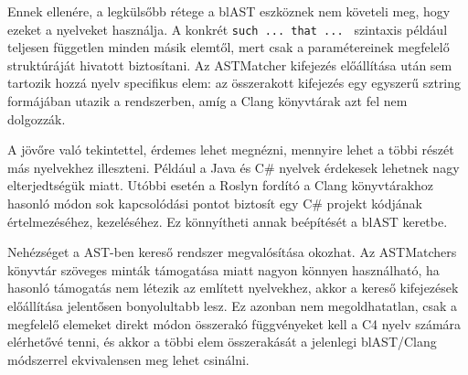 Ennek ellenére, a legkülsőbb rétege a blAST eszköznek nem követeli meg, hogy ezeket a nyelveket használja.
A konkrét {\tt such ... that ... } szintaxis például teljesen független minden másik elemtől, mert csak a paramétereinek megfelelő struktúráját hivatott biztosítani.
Az ASTMatcher kifejezés előállítása után sem tartozik hozzá nyelv specifikus elem: az összerakott kifejezés egy egyszerű sztring formájában utazik a rendszerben, amíg a Clang könyvtárak azt fel nem dolgozzák.

A jövőre való tekintettel, érdemes lehet megnézni, mennyire lehet a többi részét más nyelvekhez illeszteni.
Például a Java és C\# nyelvek érdekesek lehetnek nagy elterjedtségük miatt.
Utóbbi esetén a Roslyn \cite{microsoftDotnetRoslyn2026} fordító a Clang könyvtárakhoz hasonló módon sok kapcsolódási pontot biztosít egy C\# projekt kódjának értelmezéséhez, kezeléséhez.
Ez könnyítheti annak beépítését a blAST keretbe.

Nehézséget a AST-ben kereső rendszer megvalósítása okozhat. 
Az ASTMatchers könyvtár szöveges minták támogatása miatt nagyon könnyen használható, ha hasonló támogatás nem létezik az említett nyelvekhez, akkor a kereső kifejezések előállítása jelentősen bonyolultabb lesz.
Ez azonban nem megoldhatatlan, csak a megfelelő elemeket direkt módon összerakó függvényeket kell a C4 nyelv számára elérhetővé tenni, és akkor a többi elem összerakását a jelenlegi blAST/Clang módszerrel ekvivalensen meg lehet csinálni.

